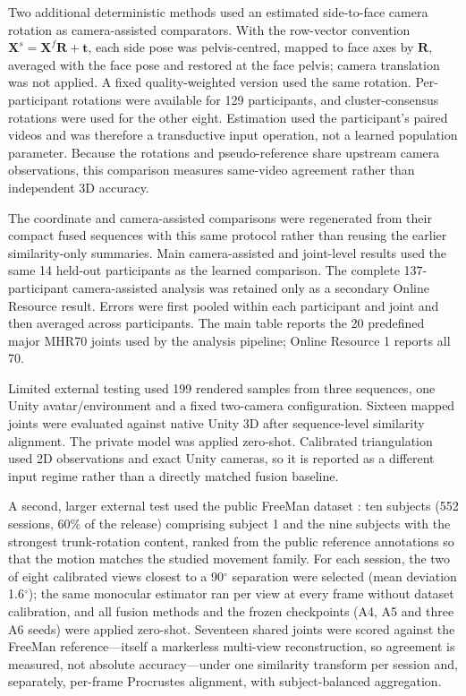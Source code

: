 \documentclass[lineno,pdflatex,sn-mathphys-num]{sn-jnl}
\begin{document}
Two additional deterministic methods used an estimated side-to-face camera
rotation as camera-assisted comparators. With the row-vector convention
$\mathbf{X}^{s}=\mathbf{X}^{f}\mathbf{R}+\mathbf{t}$, each side pose was
pelvis-centred, mapped to face axes by $\mathbf{R}$, averaged with the face pose
and restored at the face pelvis; camera translation was not applied. A fixed
quality-weighted version used the same rotation. Per-participant rotations were
available for 129 participants, and cluster-consensus rotations were used for
the other eight. Estimation used the participant's paired videos and was
therefore a transductive input operation, not a learned population parameter.
Because the rotations and pseudo-reference share upstream camera observations,
this comparison measures same-video agreement rather than independent 3D
accuracy.

The coordinate and camera-assisted comparisons were regenerated from their
compact fused sequences with this same protocol rather than reusing the earlier
similarity-only summaries. Main camera-assisted and joint-level results used
the same 14 held-out participants as the learned comparison. The complete
137-participant camera-assisted analysis was retained only as a secondary
Online Resource result. Errors were first pooled within each participant and
joint and then averaged across participants. The main table reports the 20
predefined major
MHR70 joints used by the analysis pipeline; Online Resource 1 reports all 70.

Limited external testing used 199 rendered samples from three sequences, one
Unity avatar/environment and a fixed two-camera configuration. Sixteen mapped
joints were evaluated against native Unity 3D after sequence-level similarity
alignment. The private model was applied zero-shot. Calibrated triangulation
used 2D observations and exact Unity cameras, so it is reported as a different
input regime rather than a directly matched fusion baseline.

A second, larger external test used the public FreeMan dataset
\cite{Wang2024FreeMan}: ten subjects (552 sessions, 60\% of the release)
comprising subject 1 and the nine subjects with the strongest trunk-rotation
content, ranked from the public reference annotations so that the motion
matches the studied movement family. For each session, the two of eight
calibrated views closest to a 90$^\circ$ separation were selected (mean
deviation 1.6$^\circ$); the same monocular estimator ran per view at every
frame without dataset calibration, and all fusion methods and the frozen
checkpoints (A4, A5 and three A6 seeds) were applied zero-shot. Seventeen
shared joints were scored against the FreeMan reference---itself a markerless
multi-view reconstruction, so agreement is measured, not absolute
accuracy---under one similarity transform per session and, separately,
per-frame Procrustes alignment, with subject-balanced aggregation.
\end{document}

